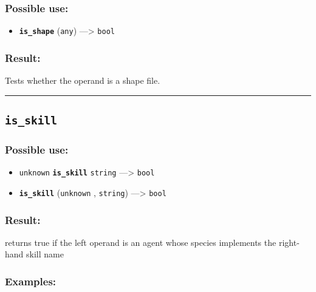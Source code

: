 \documentclass[]{book}
\providecommand{\tightlist}{%
  \setlength{\itemsep}{0pt}\setlength{\parskip}{0pt}}
\theoremstyle{definition}
\theoremstyle{definition}
\theoremstyle{definition}
\theoremstyle{remark}
\begin{document}
\subsubsection{Possible use:}\label{possible-use-302}

\begin{itemize}
\tightlist
\item
  \textbf{\texttt{is\_shape}} (\texttt{any}) ---\textgreater{}
  \texttt{bool}
\end{itemize}

\subsubsection{Result:}\label{result-292}

Tests whether the operand is a shape file.

\begin{center}\rule{0.5\linewidth}{\linethickness}\end{center}

\subsection{\texorpdfstring{\texttt{is\_skill}}{is\_skill}}\label{is_skill}

\subsubsection{Possible use:}\label{possible-use-303}

\begin{itemize}
\tightlist
\item
  \texttt{unknown} \textbf{\texttt{is\_skill}} \texttt{string}
  ---\textgreater{} \texttt{bool}
\item
  \textbf{\texttt{is\_skill}} (\texttt{unknown} , \texttt{string})
  ---\textgreater{} \texttt{bool}
\end{itemize}

\subsubsection{Result:}\label{result-293}

returns true if the left operand is an agent whose species implements
the right-hand skill name

\subsubsection{Examples:}\label{examples-217}
\end{document}
